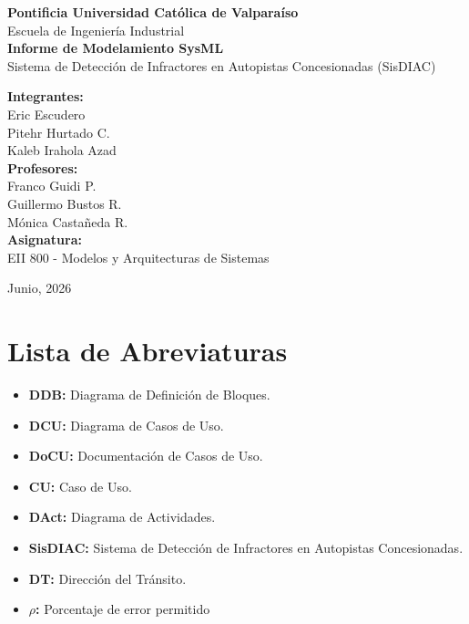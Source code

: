 \documentclass[12pt,letterpaper]{article}
\begin{document}
\begin{titlepage}
	\centering
	\vspace*{2cm}
	{\Large \textbf{Pontificia Universidad Católica de Valparaíso}}\\[0.5cm]
	{\large Escuela de Ingeniería Industrial}\\[3cm]

	{\Huge \textbf{Informe de Modelamiento SysML}}\\[0.5cm]
	{\Large Sistema de Detección de Infractores en Autopistas Concesionadas (SisDIAC)}\\[3cm]

	\begin{flushright}
		\textbf{Integrantes:}\\
		Eric Escudero\\
		Pitehr Hurtado C.\\
		Kaleb Irahola Azad\\[1cm]
		\textbf{Profesores:}\\
		Franco Guidi P.\\
		Guillermo Bustos R.\\
		Mónica Castañeda R.\\[1cm]
		\textbf{Asignatura:}\\
		EII 800 - Modelos y Arquitecturas de Sistemas
	\end{flushright}

	\vfill
	{\large Junio, 2026}
\end{titlepage}

\tableofcontents
\newpage
\listoffigures
\newpage

\section*{Lista de Abreviaturas}
\begin{itemize}
	\item \textbf{DDB:} Diagrama de Definición de Bloques.
	\item \textbf{DCU:} Diagrama de Casos de Uso.
	\item \textbf{DoCU:} Documentación de Casos de Uso.
	\item \textbf{CU:} Caso de Uso.
	\item \textbf{DAct:} Diagrama de Actividades.
	\item \textbf{SisDIAC:} Sistema de Detección de Infractores en Autopistas Concesionadas.
	\item \textbf{DT:} Dirección del Tránsito.
	\item \textbf{$\rho$:} Porcentaje de error permitido
\end{itemize}
\end{document}
